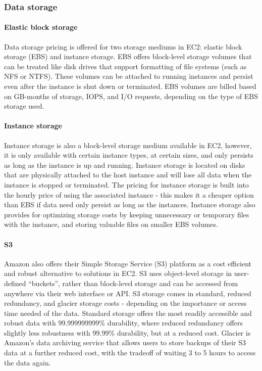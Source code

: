 \documentclass{frontiersSCNS} %
\begin{document}
\subsubsection{Data storage}

\paragraph{Elastic block storage}
Data storage pricing is offered for two storage mediums in EC2: elastic block storage (EBS) and instance storage. EBS offers block-level storage volumes that can be treated like disk drives that support formatting of file systems (such as NFS or NTFS). These volumes can be attached to running instances and persist even after the instance is shut down or terminated. EBS volumes are billed based on GB-months of storage, IOPS, and I/O requests, depending on the type of EBS storage used.

\paragraph{Instance storage}
Instance storage is also a block-level storage medium available in EC2, however, it is only available with certain instance types, at certain sizes, and only persists as long as the instance is up and running. Instance storage is located on disks that are physically attached to the host instance and will lose all data when the instance is stopped or terminated. The pricing for instance storage is built into the hourly price of using the associated instance - this makes it a cheaper option than EBS if data need only persist as long as the instances. Instance storage also provides for optimizing storage costs by keeping unnecessary or temporary files with the instance, and storing valuable files on smaller EBS volumes.

\paragraph{S3}
Amazon also offers their Simple Storage Service (S3) platform as a cost efficient and robust alternative to solutions in EC2. S3 uses object-level storage in user-defined “buckets”, rather than block-level storage and can be accessed from anywhere via their web interface or API. S3 storage comes in standard, reduced redundancy, and glacier storage costs - depending on the importance or access time needed of the data. Standard storage offers the most readily accessible and robust data with 99.999999999\% durability, where reduced redundancy offers slightly less robustness with 99.99\% durability, but at a reduced cost. Glacier is Amazon’s data archiving service that allows users to store backups of their S3 data at a further reduced cost, with the tradeoff of waiting 3 to 5 hours to access the data again.
\end{document}
